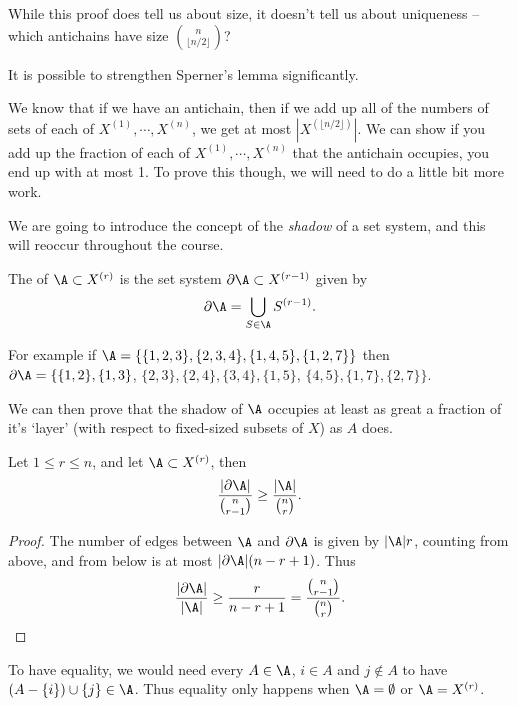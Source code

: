 \begin{remark}
    While this proof does tell us about size, it doesn't tell us about uniqueness -- which antichains have size $\binom{n}{\lfloor n/2 \rfloor}$?
\end{remark}

It is possible to strengthen Sperner's lemma significantly. 

We know that if we have an antichain, then if we add up all of the numbers of sets of each of $X^{(1)}, \cdots, X^{(n)}$, we get at most $|X^{(\lfloor n/2 \rfloor)}|$. We can show if you add up the fraction of each of $X^{(1)}, \cdots, X^{(n)}$ that the antichain occupies, you end up with at most 1.
To prove this though, we will need to do a little bit more work.

We are going to introduce the concept of the \emph{shadow} of a set system, and this will reoccur throughout the course.

\begin{definition}[Shadow]
    The  of $\A \subset X^{(r)}$ is the set system $\partial \A \subset X^{(r - 1)}$ given by 
    $$
    \partial \A = \bigcup_{S \in \A} S^{(r - 1)}.
    $$
\end{definition}

For example if $\A = \{\{1,2,3\}, \{2, 3, 4\}, \{1, 4, 5\}, \{1, 2, 7\}\}$ then $\partial \A = \{\{1, 2\}, \{1, 3\}$, $\{2, 3\}, \{2, 4\}, \{3, 4\}, \{1, 5\}$, $\{4, 5\}, \{1, 7\}, \{2, 7\}\}$.

We can then prove that the shadow of $\A$ occupies at least as great a fraction of it's `layer' (with respect to fixed-sized subsets of $X$) as $A$ does.

\begin{lemma}
    Let $1 \leq r \leq n$, and let $\A \subset X^{(r)}$, then 
    $$
    \frac{|\partial \A|}{\binom{n}{r - 1}} \geq \frac{|\A|}{\binom{n}{r}}.
    $$
\end{lemma}
\begin{proof}
    The number of edges between $\A$ and $\partial \A$ is given by $|\A| r$, counting from above, and from below is at most $|\partial \A|(n - r + 1)$. Thus
    $$
    \frac{|\partial \A|}{|\A|} \geq \frac{r}{n - r + 1} = \frac{\binom{n}{r-1}}{\binom{n}{r}}.
    $$
\end{proof}

To have equality, we would need every $A \in \A$, $i \in A$ and $j \not \in A$ to have $(A - \{i\}) \cup \{j\} \in \A$. Thus equality only happens when $\A = \emptyset$ or $\A = X^{(r)}$.

